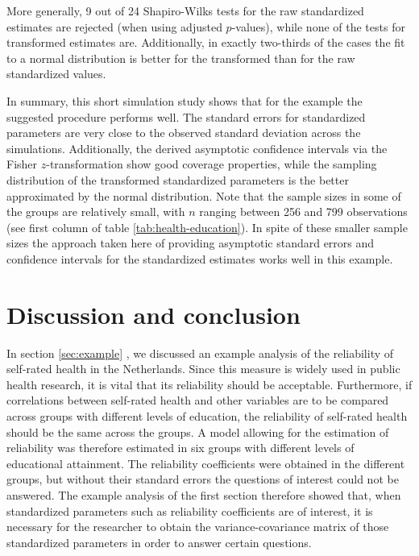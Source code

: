 \documentclass[a4paper,11pt]{article}
\newcommand{\0}{\boldsymbol{0}}
\begin{document}
More generally, 9 out of 24 Shapiro-Wilks tests for the raw standardized estimates are rejected (when using
adjusted $p$-values), while none of the tests for transformed estimates are. 
Additionally, in exactly two-thirds of the cases the fit to a normal distribution is better for the transformed than for the
raw standardized values. 

In summary, this short simulation study shows that for the example the suggested procedure performs well.
The standard errors for standardized parameters  are  very close to the observed standard deviation across 
the simulations. Additionally, the derived asymptotic confidence intervals via the Fisher $z$-transformation
show good coverage properties, while the sampling distribution of the  transformed standardized parameters is 
the better approximated by the normal distribution.
Note that the sample sizes in 
some of the groups are relatively small, with $n$ ranging between 256 and 799 observations (see first column of table \ref{tab:health-education}).
In spite of these smaller sample sizes the approach taken here of providing asymptotic standard errors and confidence intervals for the 
standardized estimates works well in this example.



\section{Discussion and conclusion\label{sec:conclusion}}


In section \ref{sec:example} , we discussed an example analysis of the reliability of self-rated health in the Netherlands. Since this measure is widely used in 
 public health research, it is vital that its reliability should be acceptable. Furthermore, if correlations between self-rated health and 
 other variables are to be compared across groups with different levels of education, the reliability of self-rated health should be the 
 same across the groups. A model allowing for the estimation of reliability was therefore estimated in six groups with different levels
 of educational attainment. The reliability coefficients were obtained in the different groups, but without their standard errors the questions
 of interest could not be answered.
The example analysis of the first section therefore showed that, when standardized parameters such as reliability coefficients are of interest, it is necessary for the researcher to obtain the variance-covariance matrix of those standardized parameters in order to answer certain questions.
\end{document}
